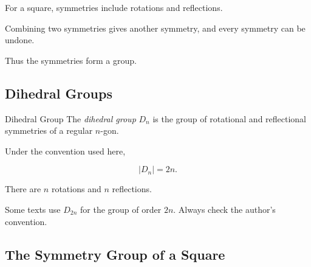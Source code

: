 For a square, symmetries include rotations and reflections.

\begin{center}
\end{center}

Combining two symmetries gives another symmetry, and every symmetry can be
undone.

Thus the symmetries form a group.

\subsection{Dihedral Groups}
\label{subsec:dihedral-groups}

\begin{definitionbox}{Dihedral Group}
The \emph{dihedral group} \(D_n\) is the group of rotational and reflectional
symmetries of a regular \(n\)-gon.
\end{definitionbox}

Under the convention used here,

\[ |D_n|=2n. \]

There are \(n\) rotations and \(n\) reflections.

\begin{notebox}
Some texts use \(D_{2n}\) for the group of order \(2n\). Always check the
author's convention.
\end{notebox}

\subsection{The Symmetry Group of a Square}
\label{subsec:square-symmetry-group}

